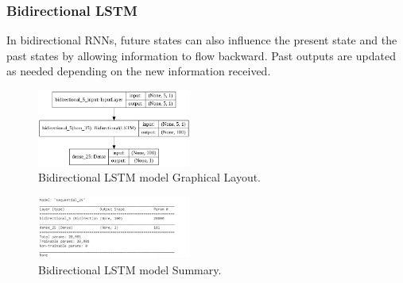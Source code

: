 \documentclass[12pt]{report}
\begin{document}
\subsubsection{Bidirectional LSTM}

In bidirectional RNNs, future states can also influence the present state and the past states by allowing information to flow backward. Past outputs are updated as needed depending on the new information received.

\begin{figure}[H]%
\begin {center}
\includegraphics[width=0.45\textwidth]{Bidirectional.png}
\caption{Bidirectional LSTM model Graphical Layout.}
\label{fig:ecg}
\end {center}
\end{figure}

\begin{figure}[H]%
\begin {center}
\includegraphics[width=0.45\textwidth]{Bidirectional1.png}
\caption{Bidirectional LSTM model Summary.}
\label{fig:ecg}
\end {center}
\end{figure}
\end{document}

